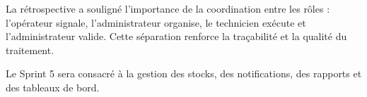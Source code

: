 La rétrospective a souligné l'importance de la coordination entre les rôles : l'opérateur signale, l'administrateur organise, le technicien exécute et l'administrateur valide. Cette séparation renforce la traçabilité et la qualité du traitement.

Le Sprint 5 sera consacré à la gestion des stocks, des notifications, des rapports et des tableaux de bord.

